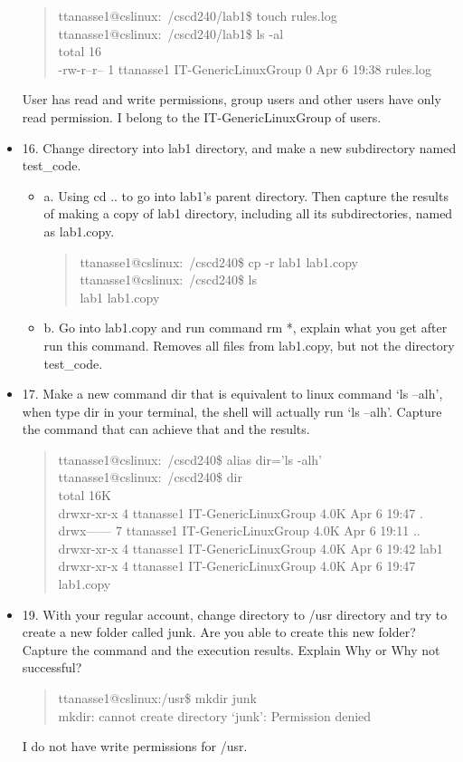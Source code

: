 \documentclass{article}
\begin{document}
\begin{itemize}
  \begin{quote}
    ttanasse1@cslinux:~/cscd240/lab1\$ touch rules.log\\
ttanasse1@cslinux:~/cscd240/lab1\$ ls -al\\
total 16\\
-rw-r--r-- 1 ttanasse1 IT-GenericLinuxGroup    0 Apr  6 19:38 rules.log\\
  \end{quote}
  User has read and write permissions, group users and other users have only read permission. I belong to the IT-GenericLinuxGroup of users.
  \item16. Change directory into lab1 directory, and make a new subdirectory named test\_code. 
  \begin{itemize}
    \item a. Using cd .. to go into lab1’s parent directory. Then capture the results of making a copy of lab1 directory, including all its subdirectories, named as lab1.copy.
    \begin{quote}
      ttanasse1@cslinux:~/cscd240\$ cp -r lab1 lab1.copy\\
ttanasse1@cslinux:~/cscd240\$ ls\\
lab1  lab1.copy
    \end{quote}
    \item b. Go into lab1.copy and run command rm *, explain what you get after run this command.
    Removes all files from lab1.copy, but not the directory test\_code.
  \end{itemize}
  \item 17. Make a new command dir that is equivalent to linux command ‘ls –alh’, when type dir in your terminal, the shell will actually run ‘ls –alh’. Capture the command that can achieve that and the results.
  \begin{quote}
    ttanasse1@cslinux:~/cscd240\$ alias dir='ls -alh'\\
ttanasse1@cslinux:~/cscd240\$ dir\\
total 16K\\
drwxr-xr-x 4 ttanasse1 IT-GenericLinuxGroup 4.0K Apr  6 19:47 .\\
drwx------ 7 ttanasse1 IT-GenericLinuxGroup 4.0K Apr  6 19:11 ..\\
drwxr-xr-x 4 ttanasse1 IT-GenericLinuxGroup 4.0K Apr  6 19:42 lab1\\
drwxr-xr-x 4 ttanasse1 IT-GenericLinuxGroup 4.0K Apr  6 19:47 lab1.copy
  \end{quote}
  \item 19. With your regular account, change directory to /usr directory and try to create a new folder called junk. Are you able to create this new folder?  Capture the command and the execution results. Explain Why or Why not successful?
  \begin{quote}
ttanasse1@cslinux:/usr\$ mkdir junk\\
mkdir: cannot create directory `junk': Permission denied
  \end{quote}
  I do not have write permissions for /usr.
\end{itemize}
\end{document}
